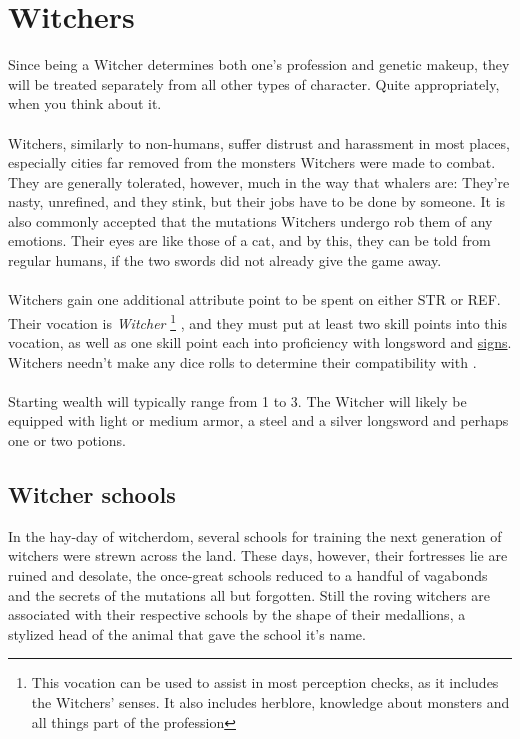 \documentclass[parskip=full,11pt]{scrreport}
\begin{document}
\section{Witchers}
Since being a Witcher determines both one's profession and genetic makeup, they will be treated separately from all other types of character. Quite appropriately,
when you think about it.
\\\\
Witchers, similarly to non-humans, suffer distrust and harassment in most places, especially cities far removed from the monsters Witchers were
made to combat. They are generally tolerated, however, much in the way that whalers are: They're nasty, unrefined, and they stink, but their
jobs have to be done by someone. It is also commonly accepted that the mutations Witchers undergo rob them of any emotions. Their eyes are like
those of a cat, and by this, they can be told from regular humans, if the two swords did not already give the game away.
\\\\
Witchers gain one additional attribute point to be spent on either STR or REF. Their vocation is \textit{Witcher}%
\footnote{This vocation can be used to assist in most perception checks, as it includes the Witchers' senses.
	It also includes herblore, knowledge about monsters and all things part of the profession}
, and they must put at least two skill points into this vocation, as well as one skill point each into proficiency with longsword
and \hyperref[rule:signs]{signs}. Witchers needn't make any dice rolls to determine their compatibility with .
\\\\
Starting wealth will typically range from 1 to 3. The Witcher will likely be equipped with light or medium armor, a steel and a silver
longsword and perhaps one or two potions.

\subsection{Witcher schools}
In the hay-day of witcherdom, several schools for training the next generation of witchers were strewn across the land.
These days, however, their fortresses lie are ruined and desolate, the once-great schools reduced to a handful of vagabonds
and the secrets of the mutations all but forgotten. Still the roving witchers are associated with their respective schools
by the shape of their medallions, a stylized head of the animal that gave the school it's name.
\end{document}
